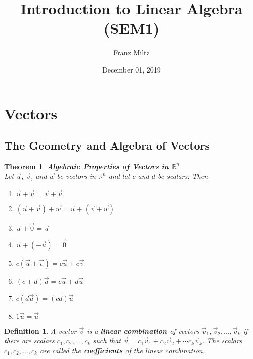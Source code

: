 \documentclass{article}
\theoremstyle{sltheorem}
\newtheorem{definition}{Definition}[section]
\newtheorem{theorem}{Theorem}[section]
\begin{document}
\title{Introduction to Linear Algebra (SEM1)}
\author{Franz Miltz}
\date{December 01, 2019}
\maketitle
\tableofcontents
\section{Vectors}
\subsection{The Geometry and Algebra of Vectors}
\begin{theorem}
    \textbf{Algebraic Properties of Vectors in $\mathbb{R}^n$}\\
    Let $\vec u$, $\vec v$, and $\vec w$ be vectors in $\mathbb{R}^n$ and let $c$ and $d$ be scalars. Then
    \begin{enumerate}
        \item $\vec u + \vec v = \vec v + \vec u$
        \item $(\vec u + \vec v) + \vec w = \vec u + (\vec v + \vec w)$
        \item $\vec u + \vec 0 = \vec u$
        \item $\vec u + (- \vec u) = \vec 0$
        \item $c(\vec u + \vec v) = c\vec u + c\vec v$
        \item $(c+d)\vec u = c\vec u + d\vec u$
        \item $c(d\vec u) = (cd)\vec u$
        \item $1\vec u = \vec u$
    \end{enumerate}
\end{theorem}
\begin{definition}
    A vector $\vec v$ is a \textbf{linear combination} of vectors $\vec v_1, \vec v_2, ...,\vec v_k$ if there are scalars $c_1, c_2, ..., c_k$ such that $\vec v = c_1 \vec v_1 + c_2 \vec v_2 + \cdots c_k\vec v_k$. The scalars $c_1, c_2, ..., c_k$ are called the \textbf{coefficients} of the linear combination.
\end{definition}
\end{document}
